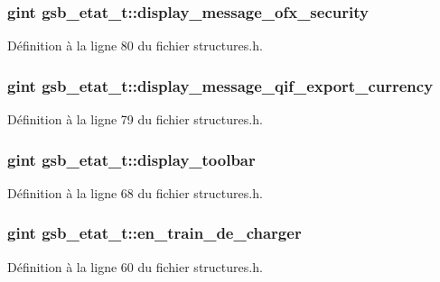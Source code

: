 \subsubsection[{display\_\-message\_\-ofx\_\-security}]{\setlength{\rightskip}{0pt plus 5cm}gint {\bf gsb\_\-etat\_\-t::display\_\-message\_\-ofx\_\-security}}\label{structgsb__etat__t_a6d399e239ddc40e231b57f28d8fe2406}


Définition à la ligne 80 du fichier structures.h.

\subsubsection[{display\_\-message\_\-qif\_\-export\_\-currency}]{\setlength{\rightskip}{0pt plus 5cm}gint {\bf gsb\_\-etat\_\-t::display\_\-message\_\-qif\_\-export\_\-currency}}\label{structgsb__etat__t_ab748e6b0a0783564a44a2a5465442c1d}


Définition à la ligne 79 du fichier structures.h.

\subsubsection[{display\_\-toolbar}]{\setlength{\rightskip}{0pt plus 5cm}gint {\bf gsb\_\-etat\_\-t::display\_\-toolbar}}\label{structgsb__etat__t_a021fc81e4d8dc513eeb6b709e666dc20}


Définition à la ligne 68 du fichier structures.h.

\subsubsection[{en\_\-train\_\-de\_\-charger}]{\setlength{\rightskip}{0pt plus 5cm}gint {\bf gsb\_\-etat\_\-t::en\_\-train\_\-de\_\-charger}}\label{structgsb__etat__t_ae139b0ab92936604ed03a01b9e3366ba}


Définition à la ligne 60 du fichier structures.h.

